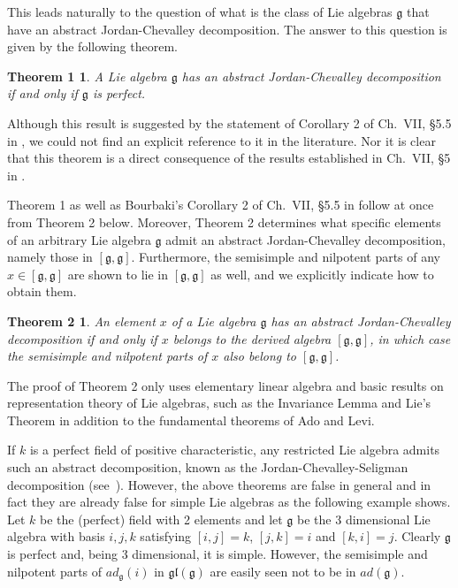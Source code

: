 \documentclass{amsart}
\newtheorem*{Theorem1}{Theorem 1}
\newtheorem*{Theorem2}{Theorem 2}
\theoremstyle{definition}
\theoremstyle{remark}
\numberwithin{equation}{section}
\newcommand \g{{\mathfrak g}}
\newcommand \gl{{\mathfrak {gl}}}
\begin{document}
This leads naturally to the question of what is the class of Lie algebras
$\g$ that have an abstract Jordan-Chevalley
decomposition.
The answer to this question is given by the following theorem.


\begin{Theorem1}
A Lie algebra $\g$ has an abstract Jordan-Chevalley
decomposition if and only if $\g$ is perfect.
\end{Theorem1}


Although this result is suggested by the statement of
Corollary 2 of Ch.\ VII, \S5.5 in \cite{Bo7}, we could not find an explicit
reference to it in the literature. Nor it is clear that this theorem is
a direct consequence of the results established in
Ch.\ VII, \S5 in \cite{Bo7}.

Theorem 1 as well as Bourbaki's Corollary 2 of Ch.\ VII, \S5.5 in \cite{Bo7}
follow at once from Theorem 2 below. Moreover, Theorem 2 determines
what specific elements of an arbitrary Lie algebra $\g$ admit an abstract Jordan-Chevalley
decomposition, namely those in $[\g,\g]$.
Furthermore, the semisimple and nilpotent parts of any $x\in [\g,\g]$ are shown
 to lie in $[\g,\g]$ as well, and we explicitly indicate how to obtain them.

\begin{Theorem2}
An element $x$ of a Lie algebra $\g$ has an abstract Jordan-Chevalley
decomposition
if and only if $x$ belongs to the derived algebra $[\g,\g]$, in which case
the semisimple and nilpotent parts of $x$ also belong to $[\g,\g]$.
\end{Theorem2}

The proof of Theorem 2 only uses
elementary linear algebra and basic results on representation theory
of Lie algebras, such as the Invariance Lemma and Lie's Theorem
in addition to the fundamental theorems of Ado and Levi.


If $k$ is a perfect field of
positive characteristic, any restricted Lie algebra
admits such an abstract decomposition, known as the
Jordan-Chevalley-Seligman decomposition (see~\cite{Se}).
However, the above theorems are false in general and in fact they are already false for
simple Lie algebras as the following example shows.
Let $k$ be the (perfect) field with 2 elements and let
$\g$ be the 3 dimensional Lie algebra with basis $i,j,k$ satisfying $[i,j]=k$, $[j,k]=i$ and
$[k,i]=j$. Clearly $\g$ is perfect and, being 3 dimensional, it is simple.
However, the semisimple and nilpotent parts of $ad_\g(i)$ in $\gl(\g)$ are easily
seen not to be in $ad(\g)$.
\end{document}
